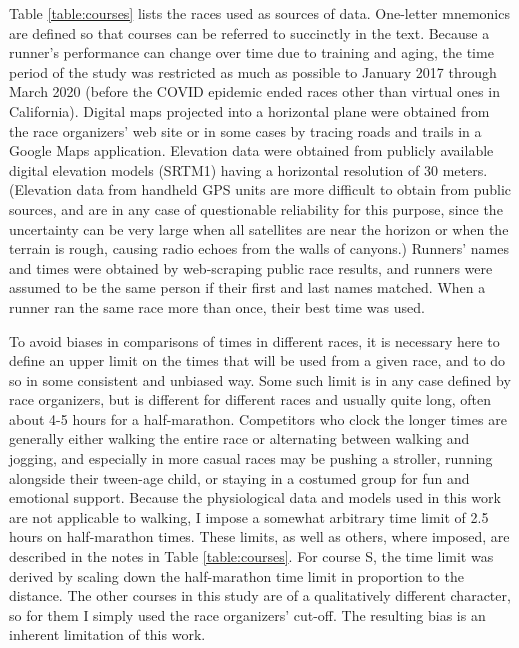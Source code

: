 \documentclass[10pt,letterpaper]{article}
\begin{document}
Table \ref{table:courses} lists the races used as sources of data.
One-letter mnemonics are defined so that courses can be referred to succinctly in the text.
Because a runner's performance can change over time due to training and aging,
the time period of the study was restricted as much as possible to January 2017 through March 2020
(before the COVID epidemic ended races other than virtual ones in California).
Digital maps projected into a horizontal plane were obtained from the race organizers' web site
or in some cases by tracing roads and trails in a Google Maps application. Elevation data
were obtained from publicly available digital elevation models (SRTM1) having a horizontal
resolution of 30 meters. (Elevation data from handheld GPS units are more difficult to
obtain from public sources, and are in any case of questionable reliability
for this purpose, since the uncertainty can be very large when all satellites are near the
horizon or when the terrain is rough, causing radio echoes from the walls of canyons.)
Runners' names and times were obtained by web-scraping public race results,
and runners were assumed to be the same person if their first and last names matched.
When a runner ran the same race more than once, their best time was used.

To avoid biases in comparisons of times in different races, it is necessary here to define
an upper limit on the times that will be used from a given race, and to do so in some
consistent and unbiased way. Some such limit is in any case
defined by race organizers, but is different for different races and usually quite long,
often about 4-5 hours for a half-marathon. Competitors who clock the longer times are generally
either walking the entire race or alternating between walking and jogging, and especially in
more casual races may be pushing a stroller, running alongside their tween-age child, or staying
in a costumed group for fun and emotional support. Because the physiological data and models
used in this work are not applicable to walking, I impose a somewhat arbitrary time limit of 2.5 hours
on half-marathon times. These limits, as well as others, where imposed,
are described in the notes in Table \ref{table:courses}. For course S, the time limit was derived by
scaling down the half-marathon time limit in proportion to the distance.
The other courses in this study are of a qualitatively different character, so for them I simply
used the race organizers' cut-off. The resulting bias is an inherent limitation of this work.
\end{document}
